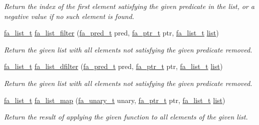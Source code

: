 \begin{DoxyCompactItemize}
\begin{DoxyCompactList}\small\item\em Return the index of the first element satisfying the given predicate in the list, or a negative value if no such element is found. \end{DoxyCompactList}\item 
\hyperlink{group___fa_list_ga35ecb12ab934ded0cce0bcf28e3bc5d2}{fa\-\_\-list\-\_\-t} \hyperlink{group___fa_list_ga817dc211bc381883c04642774ac6ce8b}{fa\-\_\-list\-\_\-filter} (\hyperlink{group___fa_gae6b6ae9fb073db0ba0bd323d511c6a98}{fa\-\_\-pred\-\_\-t} pred, \hyperlink{group___fa_ga915ddeae99ad7568b273d2b876425197}{fa\-\_\-ptr\-\_\-t} ptr, \hyperlink{group___fa_list_ga35ecb12ab934ded0cce0bcf28e3bc5d2}{fa\-\_\-list\-\_\-t} \hyperlink{literals_8h_a4ddd63dfcfec2b4d5741a56aa6003c76}{list})
\begin{DoxyCompactList}\small\item\em Return the given list with all elements not satisfying the given predicate removed. \end{DoxyCompactList}\item 
\hyperlink{group___fa_list_ga35ecb12ab934ded0cce0bcf28e3bc5d2}{fa\-\_\-list\-\_\-t} \hyperlink{group___fa_list_ga7626d0fc79cf31d21a966f59b8ac7fc0}{fa\-\_\-list\-\_\-dfilter} (\hyperlink{group___fa_gae6b6ae9fb073db0ba0bd323d511c6a98}{fa\-\_\-pred\-\_\-t} pred, \hyperlink{group___fa_ga915ddeae99ad7568b273d2b876425197}{fa\-\_\-ptr\-\_\-t} ptr, \hyperlink{group___fa_list_ga35ecb12ab934ded0cce0bcf28e3bc5d2}{fa\-\_\-list\-\_\-t} \hyperlink{literals_8h_a4ddd63dfcfec2b4d5741a56aa6003c76}{list})
\begin{DoxyCompactList}\small\item\em Return the given list with all elements not satisfying the given predicate removed. \end{DoxyCompactList}\item 
\hyperlink{group___fa_list_ga35ecb12ab934ded0cce0bcf28e3bc5d2}{fa\-\_\-list\-\_\-t} \hyperlink{group___fa_list_ga13621e91a0a85cf78916a33b9033e831}{fa\-\_\-list\-\_\-map} (\hyperlink{group___fa_gaaafae8ab9ebae9019133108e56d2d4d1}{fa\-\_\-unary\-\_\-t} unary, \hyperlink{group___fa_ga915ddeae99ad7568b273d2b876425197}{fa\-\_\-ptr\-\_\-t} ptr, \hyperlink{group___fa_list_ga35ecb12ab934ded0cce0bcf28e3bc5d2}{fa\-\_\-list\-\_\-t} \hyperlink{literals_8h_a4ddd63dfcfec2b4d5741a56aa6003c76}{list})
\begin{DoxyCompactList}\small\item\em Return the result of applying the given function to all elements of the given list. \end{DoxyCompactList}\item 

\end{DoxyCompactItemize}
